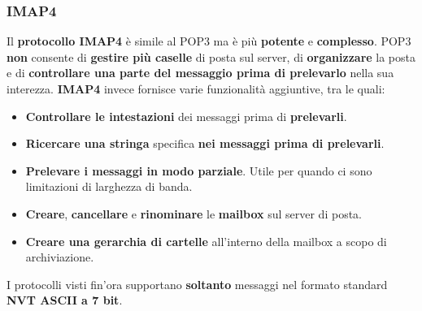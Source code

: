 \documentclass[11pt,a4paper,oneside]{book}
\theoremstyle{definition}
\begin{document}
\subsubsection{IMAP4}
Il \textbf{protocollo IMAP4} è simile al POP3 ma è più \textbf{potente} e \textbf{complesso}. POP3 \textbf{non} consente di \textbf{gestire più caselle }di posta sul server, di \textbf{organizzare} la posta e di \textbf{controllare una parte del messaggio prima di prelevarlo} nella sua interezza. \textbf{IMAP4} invece fornisce varie funzionalità aggiuntive, tra le quali:
\begin{itemize}
	\item \textbf{Controllare le intestazioni} dei messaggi prima di \textbf{prelevarli}.
	\item \textbf{Ricercare una stringa} specifica \textbf{nei messaggi prima di prelevarli}.
	\item \textbf{Prelevare i messaggi in modo parziale}. Utile per quando ci sono limitazioni di larghezza di banda.
	\item \textbf{Creare}, \textbf{cancellare} e \textbf{rinominare} le \textbf{mailbox} sul server di posta.
	\item \textbf{Creare una gerarchia di cartelle} all'interno della mailbox a scopo di archiviazione.
\end{itemize}
I protocolli visti fin'ora supportano \textbf{soltanto} messaggi nel formato standard\textbf{ NVT ASCII a 7 bit}.

\pagebreak
\end{document}
